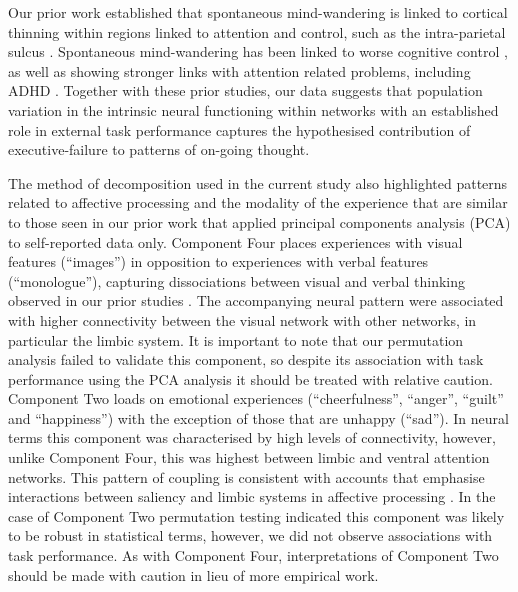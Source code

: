 Our prior work established that spontaneous mind-wandering is linked to cortical thinning within regions linked to attention and control, such as the intra-parietal sulcus \cite{Golchert2017}.
Spontaneous mind-wandering has been linked to worse cognitive control \cite{Robison2018},
as well as showing stronger links with attention related problems, including ADHD \cite{SeliADHD2015}.
Together with these prior studies, our data suggests that population variation in the intrinsic neural functioning within networks with an established role in external task performance captures the hypothesised contribution of executive-failure to patterns of on-going thought.

The method of decomposition used in the current study also highlighted patterns related to affective processing and the modality of the experience that are similar to those seen in our prior work that applied principal components analysis (PCA) to self-reported data only. Component Four places experiences with visual features (“images”) in opposition to experiences with verbal features (“monologue”), capturing dissociations between visual and verbal thinking observed in our prior studies \cite{Konishi2015,Medea2016,Smallwood2016}.
The accompanying neural pattern were associated with higher connectivity between the visual network with other networks, in particular the limbic system. It is important to note that our permutation analysis failed to validate this component, so despite its association with task performance using the PCA analysis it should be treated with relative caution. Component Two loads on emotional experiences (“cheerfulness”, “anger”, “guilt” and “happiness”) with the exception of those that are unhappy (“sad”). In neural terms this component was characterised by high levels of connectivity, however, unlike Component Four, this was highest between limbic and ventral attention networks. This pattern of coupling is consistent with accounts that emphasise interactions between saliency and limbic systems in affective processing \cite{Touroutoglou2012}.
In the case of Component Two permutation testing indicated this component was likely to be robust in statistical terms, however, we did not observe associations with task performance. As with Component Four, interpretations of Component Two should be made with caution in lieu of more empirical work.

